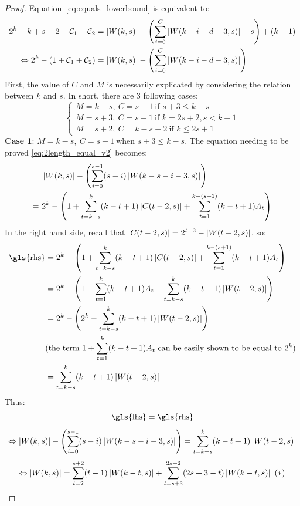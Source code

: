 \begin{proof}
    Equation~\ref{eq:equals_lowerbound} is equivalent to:
    \begin{align}
        2^{k}+k+s-2-{\cal C}_{1}-{\cal C}_{2} &= \left \lvert  W(k,s) \right \rvert - \left(\sum_{i=0}^{C}\left \lvert  W(k-i-d-3,s) \right \rvert - s\right) +(k-1) \nonumber\\
        \Leftrightarrow 2^{k} - (1+{\cal C}_{1}+{\cal C}_{2}) &= \left \lvert W(k,s) \right \rvert - \left( \sum_{i=0}^{C}\left \lvert  W(k-i-d-3,s) \right \rvert \right) \label{eq:2length_equal_v2}
    \end{align}
    First, the value of $C$ and $M$ is necessarily explicated by considering the relation between $k$ and $s$. In short, there are $3$ following cases:
    \[
    \left\{\begin{matrix}
        M=k-s,\ C = s-1\ \text{if\ } s+3\leq k-s\\
        M=s+3,\ C = s-1\ \text{if\ } k=2s+2,s<k-1\\
        M=s+2,\ C = k-s-2\ \text{if\ } k\leq 2s+1
    \end{matrix}\right.
    \]
    \textbf{Case 1}: $M=k-s,\ C = s-1\ \text{when\ } s+3\leq k-s$. The equation needing to be proved \ref{eq:2length_equal_v2} becomes:
    \begin{align*}
        &\card{W(k,s)} - \left(\sum_{i=0}^{s-1}(s-i)\card{W(k-s-i-3,s)}\right) \\
        =\ &2^{k}-\left(1+\sum_{t=k-s}^{k}(k-t+1)\card{C(t-2,s)}+\sum_{t=1}^{k-(s+1)}(k-t+1)A_{t}\right)
    \end{align*}
    In the right hand side, recall that $\left \lvert C(t-2,s) \right \rvert = 2^{t-2}-\left \lvert  W(t-2,s) \right \rvert$, so:
    \begin{align*}
        \mathrm{\gls{rhs}} &= 2^{k}-\left(1+\sum_{t=k-s}^{k}(k-t+1)\card {C(t-2,s)}+\sum_{t=1}^{k-(s+1)}(k-t+1)A_{t}\right)\\
        &=2^{k} - \left(1+\sum_{t=1}^{k}(k-t+1)A_{t}-\sum_{t=k-s}^{k}(k-t+1)\card{W(t-2,s)}\right)\\
        &=2^{k} - \left(2^{k}-\sum_{t=k-s}^{k}(k-t+1)\card{W(t-2,s)}\right)\\
        &(\text{the term }1+\sum_{t=1}^{k}(k-t+1)A_{t} \text{ can be easily shown to be equal to } 2^{k})\\
        &= \sum_{t=k-s}^{k}(k-t+1)\card{W(t-2,s)}
    \end{align*}
    Thus: \[\mathrm{\gls{lhs}}=\mathrm{\gls{rhs}}\]
    \[\Leftrightarrow \left \lvert W(k,s) \right \rvert - \left(\sum_{i=0}^{s-1}(s-i)\left \lvert  W(k-s-i-3,s) \right \rvert \right) = \sum_{t=k-s}^{k}(k-t+1)\left \lvert  W(t-2,s) \right \rvert\]
    \[\Leftrightarrow \left \lvert W(k,s) \right \rvert = \sum_{t=2}^{s+2}(t-1)\left \lvert W(k-t,s) \right \rvert + \sum_{t=s+3}^{2s+2}(2s+3-t)\left \lvert  W(k-t,s) \right \rvert\ (*)\]

\end{proof}
